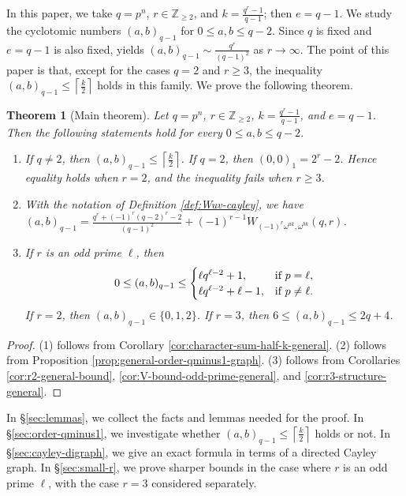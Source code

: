 \documentclass[10pt,a4paper]{article}
\newtheorem{thm}{Theorem}[section]
\numberwithin{equation}{section}
\begin{document}
In this paper, we take $q=p^n$, $r\in \mathbb{Z}_{\ge 2}$, and $k=\frac{q^r-1}{q-1}$; then $e=q-1$. We study the cyclotomic numbers $(a,b)_{q-1}$ for $0\le a,b\le q-2$. Since $q$ is fixed and $e=q-1$ is also fixed, \cite{Katre1989} yields $(a,b)_{q-1}\sim \frac{q^r}{(q-1)^2}$ as $r\to \infty$. The point of this paper is that, except for the cases $q=2$ and $r\ge 3$, the inequality $(a,b)_{q-1}\le \left\lceil \frac{k}{2}\right\rceil$ holds in this family. We prove the following theorem.


\begin{thm}[Main theorem]\label{thm:maintheorem}
Let $q=p^n$, $r\in \mathbb{Z}_{\ge 2}$, $k=\frac{q^r-1}{q-1}$, and $e=q-1$. Then the following statements hold for every $0\le a,b\le q-2$.
\begin{enumerate}[label=\textup{(\arabic*)},leftmargin=2.5em]
\item If $q\neq 2$, then $(a,b)_{q-1}\le \left\lceil \frac{k}{2}\right\rceil$. If $q=2$, then $(0,0)_1=2^r-2$. Hence equality holds when $r=2$, and the inequality fails when $r\ge 3$.

\item With the notation of Definition \ref{def:Wuv-cayley}, we have $(a,b)_{q-1}=\frac{q^r+(-1)^r(q-2)^r-2}{(q-1)^2}+(-1)^{r-1}W_{(-1)^r\omega^{ak},\omega^{bk}}(q,r)$.

\item If $r$ is an odd prime $\ell$, then
\[
0\le (a,b)_{q-1}\le
\begin{cases}
\ell q^{\ell-2}+1, & \textup{if } p=\ell,\\
\ell q^{\ell-2}+\ell-1, & \textup{if } p\neq\ell.
\end{cases}
\]
If $r=2$, then $(a,b)_{q-1}\in \{0,1,2\}$. If $r=3$, then $6\le (a,b)_{q-1}\le 2q+4$.
\end{enumerate}
\end{thm}

\begin{proof}
\textup{(1)} follows from Corollary \ref{cor:character-sum-half-k-general}. \textup{(2)} follows from Proposition \ref{prop:general-order-qminus1-graph}.
\textup{(3)} follows from Corollaries \ref{cor:r2-general-bound}, \ref{cor:V-bound-odd-prime-general}, and \ref{cor:r3-structure-general}.
\end{proof}


In \S\ref{sec:lemmas}, we collect the facts and lemmas needed for the proof. In \S\ref{sec:order-qminus1}, we investigate whether $(a,b)_{q-1}\le \left\lceil \frac{k}{2}\right\rceil$ holds or not. In \S\ref{sec:cayley-digraph}, we give an exact formula in terms of a directed Cayley graph. In \S\ref{sec:small-r}, we prove sharper bounds in the case where $r$ is an odd prime $\ell$, with the case $r=3$ considered separately.
\end{document}
